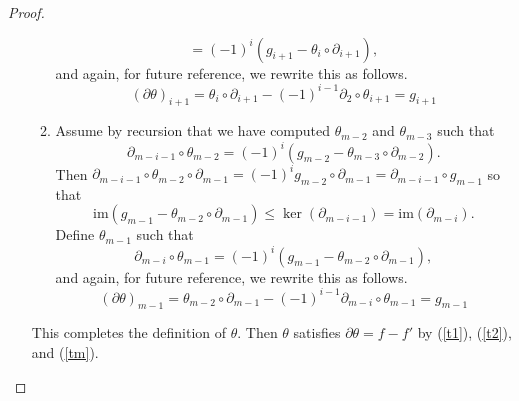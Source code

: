 \documentclass[12pt]{article}
\newcounter{savedenumii}
\begin{document}
\begin{proof}
\begin{enumerate}
\begin{enumerate}
\[=\left(-1\right)^i \left(g_{i+1}-\theta_i\circ\partial_{i+1}\right),\]
and again, for future reference, we rewrite this as follows.
\begin{equation}\label{t2}
\left(\partial\theta\right)_{i+1}=\theta_i\circ\partial_{i+1}
-\left(-1\right)^{i-1}\partial_2\circ\theta_{i+1}=g_{i+1}
\end{equation}
\item Assume by recursion that we have computed $\theta_{m-2}$
and $\theta_{m-3}$ such that \[\partial_{m-i-1}\circ\theta_{m-2}
=\left(-1\right)^i\left(g_{m-2}-\theta_{m-3}\circ\partial_{m-2}\right).\]
Then $\partial_{m-i-1}\circ\theta_{m-2}\circ\partial_{m-1}
=\left(-1\right)^i g_{m-2}\circ\partial_{m-1}
=\partial_{m-i-1}\circ g_{m-1}$ so that
\[\mathrm{im}\left(g_{m-1}-\theta_{m-2}\circ\partial_{m-1}\right)
\le\ker\left(\partial_{m-i-1}\right)=\mathrm{im}\left(\partial_{m-i}\right).\]
Define $\theta_{m-1}$
such that \[\partial_{m-i}\circ\theta_{m-1}
=\left(-1\right)^i\left(g_{m-1}-\theta_{m-2}\circ\partial_{m-1}\right),\]
and again, for future reference, we rewrite this as follows.
\begin{equation}\label{tm}
\left(\partial\theta\right)_{m-1}=\theta_{m-2}\circ\partial_{m-1}
-\left(-1\right)^{i-1}\partial_{m-i}\circ\theta_{m-1}=g_{m-1}
\end{equation}
\setcounter{savedenumii}{\value{enumii}}
\end{enumerate}
This completes the definition of $\theta$. Then $\theta$ satisfies
$\partial\theta=f-f'$ by (\ref{t1}), (\ref{t2}), and (\ref{tm}).


\end{enumerate}
\end{proof}
\end{document}
